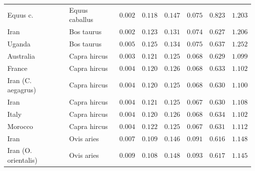 \documentclass{article}
\begin{document}
\begin{center}
\begin{longtable*}{|l|l|r|r|r|r|r|r|}
            \bottomrule
            \endlastfoot
             Equus c. &      Equus caballus &               $ 0.002$ &                    $ 0.118$ &  $ 0.147$ &            $ 0.075$ &                $ 0.823$ &           $ 1.203$ \\
            Iran &          Bos taurus &               $ 0.002$ &                    $ 0.123$ &  $ 0.131$ &            $ 0.074$ &                $ 0.627$ &           $ 1.206$ \\
            Uganda &          Bos taurus &               $ 0.005$ &                    $ 0.125$ &  $ 0.134$ &            $ 0.075$ &                $ 0.637$ &           $ 1.252$ \\
             Australia &        Capra hircus &               $ 0.003$ &                    $ 0.121$ &  $ 0.125$ &            $ 0.068$ &                $ 0.629$ &           $ 1.099$ \\
             France &        Capra hircus &               $ 0.004$ &                    $ 0.120$ &  $ 0.126$ &            $ 0.068$ &                $ 0.633$ &           $ 1.102$ \\
             Iran (C. aegagrus) &        Capra hircus &               $ 0.004$ &                    $ 0.120$ &  $ 0.125$ &            $ 0.068$ &                $ 0.630$ &           $ 1.100$ \\
             Iran &        Capra hircus &               $ 0.004$ &                    $ 0.121$ &  $ 0.125$ &            $ 0.067$ &                $ 0.630$ &           $ 1.108$ \\
             Italy &        Capra hircus &               $ 0.004$ &                    $ 0.120$ &  $ 0.126$ &            $ 0.068$ &                $ 0.634$ &           $ 1.102$ \\
             Morocco &        Capra hircus &               $ 0.004$ &                    $ 0.122$ &  $ 0.125$ &            $ 0.067$ &                $ 0.631$ &           $ 1.112$ \\
            Iran &          Ovis aries &               $ 0.007$ &                    $ 0.109$ &  $ 0.146$ &            $ 0.091$ &                $ 0.616$ &           $ 1.148$ \\
            Iran (O. orientalis) &          Ovis aries &               $ 0.009$ &                    $ 0.108$ &  $ 0.148$ &            $ 0.093$ &                $ 0.617$ &           $ 1.145$ \\

\end{longtable*}
\end{center}
\end{document}
